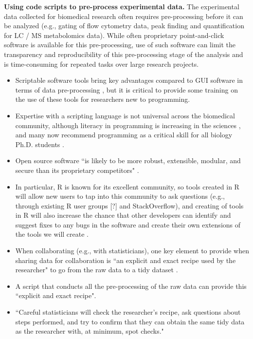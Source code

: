 \documentclass[pdftex,english,11pt,parskip=half]{scrartcl}
\begin{document}
\textbf{Using code scripts to pre-process experimental data.} The experimental data collected for biomedical research often requires 
pre-processing before it can be analyzed (e.g., gating of flow cytometry data, 
peak finding and quantification for LC / MS metabolomics data). While 
often proprietary point-and-click software is available for this pre-processing,
use of such software can limit the transparency and reproducibility of this 
pre-processing stage of the analysis and is 
time-consuming for repeated tasks over large research projects. 

\begin{itemize}
\item Scriptable
software tools bring key advantages compared to GUI software in terms of data
pre-processing \cite{cetinkaya2017infrastructure, huber2015orchestrating,
preeyanon2014reproducible, piccolo2016tools}, but it is critical to provide some
training on the use of these tools for researchers new to programming. 
\item Expertise
with a scripting language is not universal across the biomedical community,
although literacy in programming is increasing in the sciences
\cite{ram2013git}, and many now recommend programming as a critical skill for
all biology Ph.D. students \cite{list2017ten}. 
\item Open source software ``is likely to be more robust, extensible, modular, and secure than its proprietary competitors" \cite{baumer2017lessons}. 
\item In particular, R is known for its excellent community, so tools created in R will allow new users to tap into this community to ask questions (e.g., through existing R user groups [?] and StackOverflow), and creating of tools in R will also increase the chance that other developers can identify and suggest fixes to any bugs in the software and create their own extensions of the tools we will create \cite{altschul2013anatomy}.
\item When collaborating (e.g., with statisticians), one key element to provide when sharing data for collaboration is ``an explicit and exact recipe used by the researcher" to go from the raw data to a tidy dataset \cite{ellis2018share}. 
\item A script that conducts all the pre-processing of the raw data can provide this ``explicit and exact recipe". 
\item ``Careful statisticians will check the researcher’s recipe, ask questions about steps performed, and try to confirm that they can obtain the same tidy data as the researcher with, at minimum, spot checks." \cite{ellis2018share}

\end{itemize}
\end{document}
